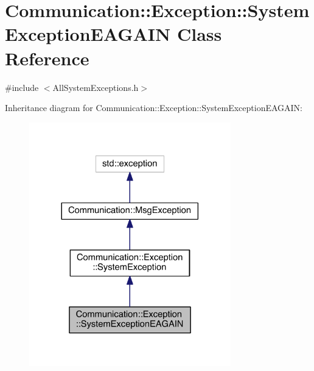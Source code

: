 \hypertarget{class_communication_1_1_exception_1_1_system_exception_e_a_g_a_i_n}{}\section{Communication\+:\+:Exception\+:\+:System\+Exception\+E\+A\+G\+A\+I\+N Class Reference}
\label{class_communication_1_1_exception_1_1_system_exception_e_a_g_a_i_n}


{\ttfamily \#include $<$All\+System\+Exceptions.\+h$>$}



Inheritance diagram for Communication\+:\+:Exception\+:\+:System\+Exception\+E\+A\+G\+A\+I\+N\+:\nopagebreak
\begin{figure}[H]
\begin{center}
\leavevmode
\includegraphics[width=248pt]{class_communication_1_1_exception_1_1_system_exception_e_a_g_a_i_n__inherit__graph}
\end{center}
\end{figure}


